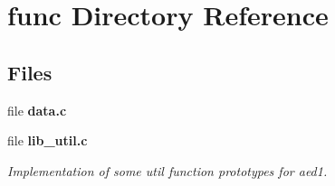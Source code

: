 \section{func Directory Reference}
\label{dir_27274c145b5957ee00156fc3be142077}
\subsection*{Files}
\begin{DoxyCompactItemize}
\item 
file {\bf data.\+c}
\item 
file {\bf lib\+\_\+util.\+c}
\begin{DoxyCompactList}\small\item\em Implementation of some util function prototypes for aed1. \end{DoxyCompactList}\end{DoxyCompactItemize}
